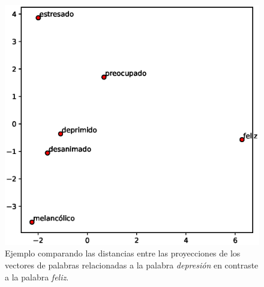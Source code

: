 \begin{figure}[!hbt]
    \centering
  \includegraphics[scale=0.7]{sections/figures/word_plot.eps}
    \caption{Ejemplo comparando las distancias entre las proyecciones de los vectores de  palabras relacionadas a la palabra \textit{depresión} en contraste a la palabra \textit{feliz}.}
    \label{fig:word_plot}
\end{figure}